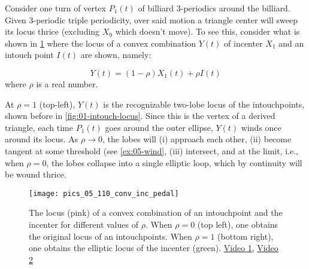Consider one turn of vertex $P_1(t)$ of billiard 3-periodics around the billiard. Given 3-periodic triple periodicity, over said motion a triangle center will sweep its locus thrice (excluding $X_9$ which doesn't move). To see this, consider what is shown in \cref{fig:05-inc-wind3} where the locus of a convex combination $Y(t)$ of incenter $X_1$ and an intouch point $I(t)$ are shown, namely:

\[ Y(t) = (1-\rho) X_1(t) +  \rho I(t)  \]
where $\rho$ is a real number.

At $\rho=1$ (top-left), $Y(t)$ is the recognizable two-lobe locus of the intouchpoints, shown before in \cref{fig:01-intouch-locus}. Since this is the vertex of a derived triangle, each time $P_1(t)$ goes around the outer ellipse, $Y(t)$ winds once around its locus. As  $\rho{\rightarrow}0$, the lobes will (i) approach each other, (ii) become tangent at some threshold (see \cref{ex:05-wind}, (iii) intersect, and at the limit, i.e., when $\rho=0$, the lobes collapse into a single elliptic loop, which by continuity will be wound thrice.

\begin{figure}
    \centering
    \texttt{[image: pics\_05\_110\_conv\_inc\_pedal]}
    \caption{The locus (pink) of a convex combination of an intouchpoint and the incenter for different values of $\rho$. When $\rho=0$ (top left), one obtains the original locus of an intouchpoints. When $\rho=1$ (bottom right), one obtains the elliptic locus of the incenter (green). \href{https://youtu.be/3Gr3Nh5-jHs}{Video 1}, \href{https://youtu.be/HZFjkWD_CnE}{Video 2}}
    \label{fig:05-inc-wind3}
\end{figure}
